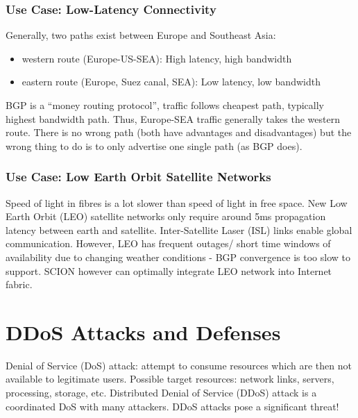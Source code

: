 \documentclass[11pt,oneside,a4paper]{article}
\begin{document}
\subsubsection{Use Case: Low-Latency Connectivity}

Generally, two paths exist between Europe and Southeast Asia: 

\vspace{-\topsep}
\begin{itemize}
	\setlength{\itemsep}{0pt}
	\setlength{\parskip}{0pt}
	\item western route (Europe-US-SEA): High latency, high bandwidth
	\item eastern route (Europe, Suez canal, SEA): Low latency, low bandwidth
\end{itemize}
\vspace{-\topsep}

BGP is a “money routing protocol”, traffic follows cheapest path, typically highest bandwidth path. Thus, Europe-SEA traffic generally takes the western route. There is no wrong path (both have advantages and disadvantages) but the wrong thing to do is to only advertise one single path (as BGP does).

\subsubsection{Use Case: Low Earth Orbit Satellite Networks}

Speed of light in fibres is a lot slower than speed of light in free space. New Low Earth Orbit (LEO) satellite networks only require around 5ms propagation latency between earth and satellite. Inter-Satellite Laser (ISL) links enable global communication. However, LEO has frequent outages/ short time windows of availability due to changing weather conditions - BGP convergence is too slow to support. SCION however can optimally integrate LEO network into Internet fabric.


\newpage

\section{DDoS Attacks and Defenses}
\label{ddos}

Denial of Service (DoS) attack: attempt to consume resources which are then not available to legitimate users. Possible target resources: network links, servers, processing, storage, etc. Distributed Denial of Service (DDoS) attack is a coordinated DoS with many attackers. DDoS attacks pose a significant threat!
\end{document}
